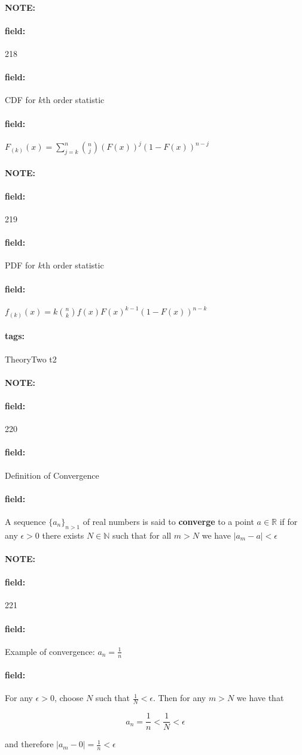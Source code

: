 \documentclass[12pt]{article}
\newenvironment{note}{\paragraph{NOTE:}}{}
\newenvironment{field}{\paragraph{field:}}{}
\newcommand*{\tags}[1]{\paragraph{tags: }#1}
\begin{document}
\begin{note} \begin{field} \tiny 218 \end{field}
  \begin{field}
    CDF for $k$th order statistic
  \end{field}
  \begin{field}
    $F_{(k)}(x) = \sum_{j = k}^n \binom{n}{j}(F(x))^j(1 -F(x))^{n-j}$
  \end{field}
\end{note}

\begin{note} \begin{field} \tiny 219 \end{field}
  \begin{field}
    PDF for $k$th order statistic
  \end{field}
  \begin{field}
    $f_{(k)}(x) = k \binom{n}{k}f(x)F(x)^{k-1}(1 - F(x))^{n-k}$
  \end{field}
\end{note}


\tags{TheoryTwo t2}

\begin{note} \begin{field} \tiny 220 \end{field}
  \begin{field}
    Definition of Convergence
  \end{field}
  \begin{field}
    A sequence $\{a_n\}_{n > 1}$ of real numbers is said to \textbf{converge} to a point $a \in \mathbb{R}$ if for any $\epsilon > 0$ there exists $N \in \mathbb{N}$ such that for all $m > N $ we have $|a_m - a| < \epsilon $
  \end{field}
\end{note}

\begin{note} \begin{field} \tiny 221 \end{field}
  \begin{field}
    Example of convergence: $a_n = \frac{1}{n}$
  \end{field}
  \begin{field}
    For any $\epsilon > 0$, choose $N$ such that $\frac{1}{N} < \epsilon$. Then for any $m > N$ we have that

    $$a_n = \frac{1}{n} < \frac{1}{N} < \epsilon$$

    and therefore $|a_m - 0| = \frac{1}{n} < \epsilon$
  \end{field}
\end{note}
\end{document}
